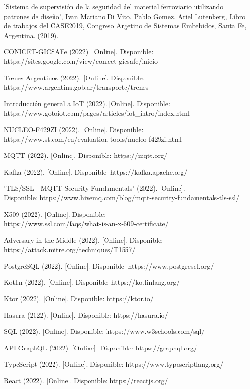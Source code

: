 \documentclass[a4paper]{IEEEtran}
\begin{document}
\begin{thebibliography}{00}

 'Sistema de supervisión de la seguridad del material
ferroviario utilizando patrones de diseño', Ivan Mariano Di Vito, Pablo Gomez, Ariel Lutenberg, Libro de trabajos del CASE2019, Congreso Argetino de Sistemas Embebidos, Santa Fe, Argentina. (2019).

 CONICET-GICSAFe (2022). [Online]. Disponible: \\
https://sites.google.com/view/conicet-gicsafe/inicio

 Trenes Argentinos (2022). [Online]. Disponible: \\
https://www.argentina.gob.ar/transporte/trenes 

 Introducción general a IoT (2022). [Online]. Disponible: \\
https://www.gotoiot.com/pages/articles/iot\_intro/index.html 

 NUCLEO-F429ZI (2022). [Online]. Disponible: \\
https://www.st.com/en/evaluation-tools/nucleo-f429zi.html

 MQTT (2022). [Online]. Disponible: https://mqtt.org/ 

 Kafka (2022). [Online]. Disponible: https://kafka.apache.org/  

 'TLS/SSL - MQTT Security Fundamentals' (2022). [Online]. \\
Disponible: https://www.hivemq.com/blog/mqtt-security-fundamentals-tls-ssl/ 

 X509 (2022). [Online]. Disponible: \\
https://www.ssl.com/faqs/what-is-an-x-509-certificate/ 

 Adversary-in-the-Middle (2022). [Online]. Disponible: \\
https://attack.mitre.org/techniques/T1557/

 PostgreSQL (2022). [Online]. Disponible: https://www.postgresql.org/

 Kotlin (2022). [Online]. Disponible: https://kotlinlang.org/

 Ktor (2022). [Online]. Disponible: https://ktor.io/ 

 Hasura (2022). [Online]. Disponible: https://hasura.io/

 SQL (2022). [Online]. Disponible: https://www.w3schools.com/sql/

 API GraphQL (2022). [Online]. Disponible: https://graphql.org/

 TypeScript (2022). [Online]. Disponible: https://www.typescriptlang.org/

 React (2022). [Online]. Disponible: https://reactjs.org/


\end{thebibliography}
\end{document}
